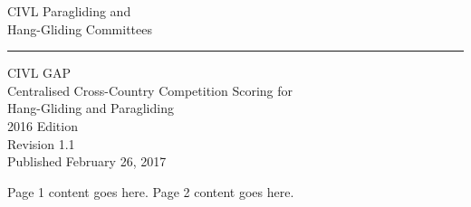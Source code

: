 \documentclass{article}
\newcommand*{\titleGap}{\begingroup
\raggedleft
{\Huge CIVL Paragliding and}\\
{\Huge Hang-Gliding Committees}\\
\vspace*{16\baselineskip}
\endgraf\rule{\textwidth}{.4pt}
\vspace*{\baselineskip}
{\Huge CIVL GAP}\\
\vspace*{2\baselineskip}
{\Large Centralised Cross-Country Competition Scoring for}\\
{\Large Hang-Gliding and Paragliding}\\
\vspace*{2\baselineskip}
2016 Edition\\
Revision 1.1\\
Published February 26, 2017\\
\endgroup}
\begin{document}
{\let\newpage\relax\titleGap}\thispagestyle{pageone}

\newpage
Page 1 content goes here.
\newpage
Page 2 content goes here.
\end{document}
